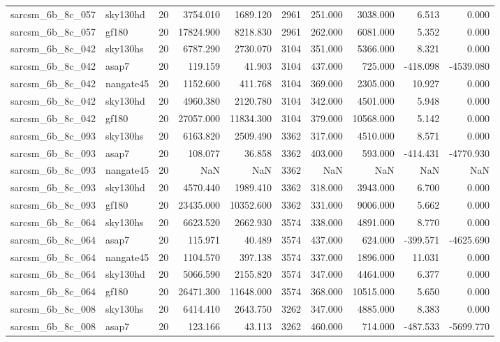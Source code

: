 \begin{tabular}{llrrrrrrrr}
sarcsm\_6b\_8c\_057 & sky130hd & 20 & 3754.010 & 1689.120 & 2961 & 251.000 & 3038.000 & 6.513 & 0.000 \\
sarcsm\_6b\_8c\_057 & gf180 & 20 & 17824.900 & 8218.830 & 2961 & 262.000 & 6081.000 & 5.352 & 0.000 \\
sarcsm\_6b\_8c\_042 & sky130hs & 20 & 6787.290 & 2730.070 & 3104 & 351.000 & 5366.000 & 8.321 & 0.000 \\
sarcsm\_6b\_8c\_042 & asap7 & 20 & 119.159 & 41.903 & 3104 & 437.000 & 725.000 & -418.098 & -4539.080 \\
sarcsm\_6b\_8c\_042 & nangate45 & 20 & 1152.600 & 411.768 & 3104 & 369.000 & 2305.000 & 10.927 & 0.000 \\
sarcsm\_6b\_8c\_042 & sky130hd & 20 & 4960.380 & 2120.780 & 3104 & 342.000 & 4501.000 & 5.948 & 0.000 \\
sarcsm\_6b\_8c\_042 & gf180 & 20 & 27057.000 & 11834.300 & 3104 & 379.000 & 10568.000 & 5.142 & 0.000 \\
sarcsm\_6b\_8c\_093 & sky130hs & 20 & 6163.820 & 2509.490 & 3362 & 317.000 & 4510.000 & 8.571 & 0.000 \\
sarcsm\_6b\_8c\_093 & asap7 & 20 & 108.077 & 36.858 & 3362 & 403.000 & 593.000 & -414.431 & -4770.930 \\
sarcsm\_6b\_8c\_093 & nangate45 & 20 & NaN & NaN & 3362 & NaN & NaN & NaN & NaN \\
sarcsm\_6b\_8c\_093 & sky130hd & 20 & 4570.440 & 1989.410 & 3362 & 318.000 & 3943.000 & 6.700 & 0.000 \\
sarcsm\_6b\_8c\_093 & gf180 & 20 & 23435.000 & 10352.600 & 3362 & 331.000 & 9006.000 & 5.662 & 0.000 \\
sarcsm\_6b\_8c\_064 & sky130hs & 20 & 6623.520 & 2662.930 & 3574 & 338.000 & 4891.000 & 8.770 & 0.000 \\
sarcsm\_6b\_8c\_064 & asap7 & 20 & 115.971 & 40.489 & 3574 & 437.000 & 624.000 & -399.571 & -4625.690 \\
sarcsm\_6b\_8c\_064 & nangate45 & 20 & 1104.570 & 397.138 & 3574 & 337.000 & 1896.000 & 11.031 & 0.000 \\
sarcsm\_6b\_8c\_064 & sky130hd & 20 & 5066.590 & 2155.820 & 3574 & 347.000 & 4464.000 & 6.377 & 0.000 \\
sarcsm\_6b\_8c\_064 & gf180 & 20 & 26471.300 & 11648.000 & 3574 & 368.000 & 10515.000 & 5.650 & 0.000 \\
sarcsm\_6b\_8c\_008 & sky130hs & 20 & 6414.410 & 2643.750 & 3262 & 347.000 & 4885.000 & 8.383 & 0.000 \\
sarcsm\_6b\_8c\_008 & asap7 & 20 & 123.166 & 43.113 & 3262 & 460.000 & 714.000 & -487.533 & -5699.770 \\

\end{tabular}
